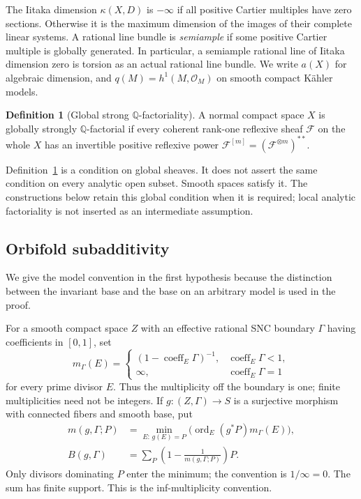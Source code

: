 \documentclass[11pt,letterpaper]{article}
\newcommand{\Q}{\mathbb{Q}}
\newcommand{\OO}{\mathcal{O}}
\newcommand{\cF}{\mathcal{F}}
\DeclareMathOperator{\ord}{ord}
\theoremstyle{definition}
\newtheorem{definition}[theorem]{Definition}
\theoremstyle{remark}
\begin{document}
The Iitaka dimension \(\kappa(X,D)\) is \(-\infty\) if all positive
Cartier multiples have zero sections. Otherwise it is the maximum
dimension of the images of their complete linear systems. A rational
line bundle is \emph{semiample} if some positive Cartier multiple is
globally generated. In particular, a semiample rational line of Iitaka
dimension zero is torsion as an actual rational line bundle.
We write \(a(X)\) for algebraic dimension, and
\(q(M)=h^1(M,\OO_M)\) on smooth compact K\"ahler models.

\begin{definition}[Global strong \(\Q\)-factoriality]
\label{def:strong}
A normal compact space \(X\) is globally strongly
\(\Q\)-factorial if every coherent rank-one reflexive sheaf
\(\cF\) on the whole \(X\) has an invertible positive reflexive
power \(\cF^{[m]}=(\cF^{\otimes m})^{**}\).
\end{definition}

Definition~\ref{def:strong} is a condition on global sheaves. It does
not assert the same condition on every analytic open subset. Smooth
spaces satisfy it. The constructions below retain this global
condition when it is required; local analytic factoriality is not
inserted as an intermediate assumption.

\subsection{Orbifold subadditivity}

We give the model convention in the first hypothesis because the
distinction between the invariant base and the base on an arbitrary
model is used in the proof.

For a smooth compact space \(Z\) with an effective rational SNC
boundary \(\Gamma\) having coefficients in \([0,1]\), set
\[
 m_\Gamma(E)=
 \begin{cases}
 (1-\operatorname{coeff}_E\Gamma)^{-1},&
                  \operatorname{coeff}_E\Gamma<1,\\
 \infty,&\operatorname{coeff}_E\Gamma=1
 \end{cases}
\]
for every prime divisor \(E\). Thus the multiplicity off the boundary
is one; finite multiplicities need not be integers. If
\(g:(Z,\Gamma)\to S\) is a surjective morphism with connected
fibers and smooth base, put
\begin{equation}\label{eq:orbifold-base}
 \begin{split}
 m(g,\Gamma;P)&=
   \min_{E:\,g(E)=P}\bigl(\ord_E(g^*P)m_\Gamma(E)\bigr),\\
 B(g,\Gamma)&=\sum_P\left(1-\frac1{m(g,\Gamma;P)}\right)P.
 \end{split}
\end{equation}
Only divisors dominating \(P\) enter the minimum; the convention is
\(1/\infty=0\). The sum has finite support. This is the
inf-multiplicity convention.
\end{document}
